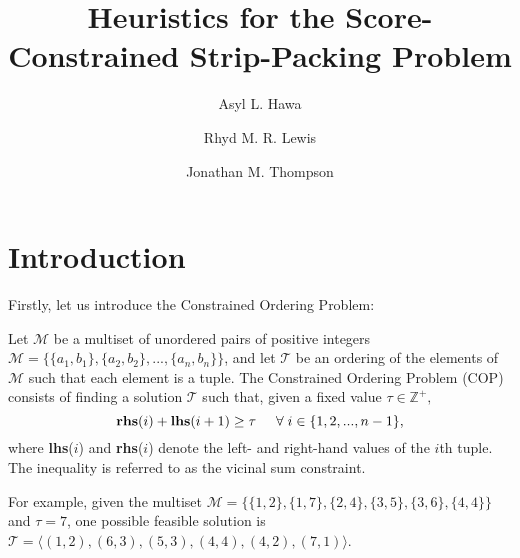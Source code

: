 \documentclass[oribibl]{llncs}
\begin{document}
	
\title{Heuristics for the Score-Constrained Strip-Packing Problem}
\author{Asyl L. Hawa \and Rhyd M. R. Lewis \and Jonathan M. Thompson}
\maketitle

\begin{abstract}
\end{abstract}

\section{Introduction}
\label{sec:intro}
Firstly, let us introduce the Constrained Ordering Problem:

\begin{definition}
	\label{defn:cop}
	Let $\mathcal{M}$ be a multiset of unordered pairs of positive integers $\mathcal{M} = \{\{a_1, b_1\}, \{a_2,b_2\},...,\{a_n,b_n\}\}$, and let $\mathcal{T}$ be an ordering of the elements of $\mathcal{M}$ such that each element is a tuple. The Constrained Ordering Problem (COP) consists of finding a solution $\mathcal{T}$ such that, given a fixed value $\tau \in \mathbb{Z}^{+},$
	\begin{equation}
		\label{eqn:vsc}
		\textup{\textbf{rhs}}(i) + \textup{\textbf{lhs}}(i+1) \geq \tau \hspace{5mm} \forall \hspace{1mm} i \in \{1,2,..., n-1\},
	\end{equation}
	where \textup{\textbf{lhs}($i$)} and \textup{\textbf{rhs}($i$)} denote the left- and right-hand values of the $i$th tuple. The inequality is referred to as the \textup{vicinal sum constraint}.
\end{definition}

For example, given the multiset $\mathcal{M} = \{\{1,2\}, \{1,7\}, \{2,4\}, \{3,5\}, \{3,6\}, \{4,4\}\}$ and $\tau = 7$, one possible feasible solution is $\mathcal{T} = \langle(1,2), (6,3), (5,3), (4,4), (4,2), (7,1) \rangle$.
\end{document}
